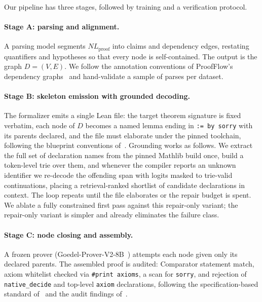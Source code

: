 \documentclass[sigconf,anonymous]{aamas}
\begin{document}
{\color{red}\label{sec:method}
Our pipeline has three stages, followed by training and a verification protocol.

\paragraph{Stage A: parsing and alignment.} A parsing model segments
$NL_{\text{proof}}$ into claims and dependency edges, restating quantifiers and
hypotheses so that every node is self-contained. The output is the graph
$D=(V,E)$. We follow the annotation conventions of ProofFlow's dependency
graphs~\citep{proofflow2025} and hand-validate a sample of parses per dataset.

\paragraph{Stage B: skeleton emission with grounded decoding.} The formalizer
emits a single Lean file: the target theorem signature is fixed verbatim, each
node of $D$ becomes a named lemma ending in \texttt{:= by sorry} with its
parents declared, and the file must elaborate under the pinned toolchain,
following the blueprint conventions of~\citet{goedelarchitect2026,
leanarchitect2026}. Grounding works as follows. We extract the full set of
declaration names from the pinned Mathlib build once, build a token-level trie
over them, and whenever the compiler reports an unknown identifier we re-decode
the offending span with logits masked to trie-valid continuations, placing a
retrieval-ranked shortlist of candidate declarations in context. The loop
repeats until the file elaborates or the repair budget is spent. We ablate a
fully constrained first pass against this repair-only variant; the repair-only
variant is simpler and already eliminates the failure class.

\paragraph{Stage C: node closing and assembly.} A frozen prover
(Goedel-Prover-V2-8B~\citep{goedelproverv2_2025}) attempts each node given only
its declared parents. The assembled proof is audited: Comparator statement
match, axiom whitelist checked via \texttt{\#print axioms}, a scan for
\texttt{sorry}, and rejection of \texttt{native\_decide} and top-level
\texttt{axiom} declarations, following the specification-based standard
of~\citet{formalqualbench2026} and the audit findings
of~\citet{faultsbench2026}.

}
\end{document}
